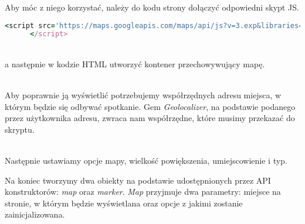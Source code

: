 Aby móc z niego korzystać, należy do kodu strony dołączyć odpowiedni skypt JS.
\begin{code}
  \begin{lstlisting}[language=Ruby, basicstyle=\ttfamily\scriptsize, showstringspaces=false]
      <script src='https://maps.googleapis.com/maps/api/js?v=3.exp&libraries=places'>
      </script>
  \end{lstlisting}
\end{code}\\

a następnie w kodzie HTML utworzyć kontener przechowywujący mapę.
\begin{code}
  
\end{code}\\

Aby poprawnie ją wyświetlić potrzebujemy współrzędnych adresu miejsca, w którym będzie się odbywać spotkanie. Gem \emph{Geolocalizer}, na podstawie podanego przez użytkownika adresu, zwraca nam współrzędne, które musimy przekazać do skryptu.

\begin{code}
  
\end{code}\\

Następnie ustawiamy opcje mapy, wielkość powiększenia, umiejscowienie i typ.

Na koniec tworzymy dwa obiekty na podstawie udostępnionych przez API konstruktorów: \emph{map} oraz \emph{marker}. \emph{Map} przyjmuje dwa parametry: miejsce na stronie, w którym będzie wyświetlana oraz opcje z jakimi zostanie zainicjalizowana.
